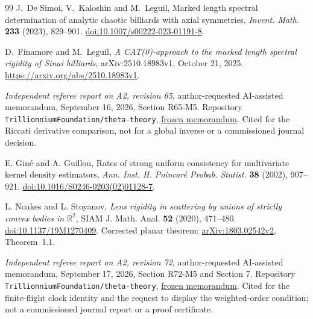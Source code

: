 \begin{thebibliography}{99}
J.~De Simoi, V.~Kaloshin and M.~Leguil, Marked length spectral
determination of analytic chaotic billiards with axial symmetries,
\emph{Invent. Math.} \textbf{233} (2023), 829--901.
\href{https://doi.org/10.1007/s00222-023-01191-8}{doi:10.1007/s00222-023-01191-8}.

D.~Finamore and M.~Leguil, \emph{A CAT(0)-approach to the marked
length spectral rigidity of Sinai billiards}, arXiv:2510.18983v1,
October 21, 2025. \url{https://arxiv.org/abs/2510.18983v1}.

\emph{Independent referee report on A2, revision 65},
author-requested AI-assisted memorandum, September 16, 2026,
Section R65-M5. Repository
\texttt{Trillionnium\allowbreak Foundation/\allowbreak theta-theory},
\href{https://github.com/TrillionniumFoundation/theta-theory/blob/7f4603531f7b97a23ce627fec47b7ddc5f4f9912/reviews/a2-v65-independent-harsh-top4-2026-09-16/REFEREE_REPORT.md}{frozen memorandum}.
Cited for the Riccati derivative comparison, not for a global inverse
or a commissioned journal decision.


E. Gin\'e and A. Guillou,
Rates of strong uniform consistency for multivariate kernel density
estimators, \emph{Ann. Inst. H. Poincar\'e Probab. Statist.}
\textbf{38} (2002), 907--921.
\href{https://doi.org/10.1016/S0246-0203(02)01128-7}{doi:10.1016/S0246-0203(02)01128-7}.

L. Noakes and L. Stoyanov,
\emph{Lens rigidity in scattering by unions of strictly convex bodies
in $\mathbb R^2$},
SIAM J. Math. Anal. \textbf{52} (2020), 471--480.
\href{https://doi.org/10.1137/19M1270409}{doi:10.1137/19M1270409}.
Corrected planar theorem: \href{https://arxiv.org/abs/1803.02542v2}
{arXiv:1803.02542v2}, Theorem~1.1.

\emph{Independent referee report on A2, revision 72},
author-requested AI-assisted memorandum, September 17, 2026,
Section R72-M5 and Section 7. Repository
\texttt{Trillionnium\allowbreak Foundation/\allowbreak theta-theory},
\href{https://github.com/TrillionniumFoundation/theta-theory/blob/c6715aff47ad6e8180acfa7ba229fd680e795293/reviews/a2-v72-independent-harsh-top4-2026-09-17/REFEREE_REPORT.md}{frozen memorandum}.
Cited for the finite-flight clock identity and the request to display the
weighted-order condition; not a commissioned journal report or a proof
certificate.


\end{thebibliography}
